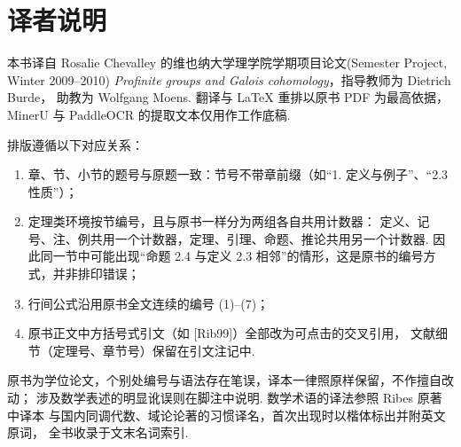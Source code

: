 
\chapter*{译者说明}

本书译自 Rosalie Chevalley 的维也纳大学理学院学期项目论文(Semester Project, Winter 2009--2010)
\emph{Profinite groups and Galois cohomology}，指导教师为 Dietrich Burde，
助教为 Wolfgang Moens. 翻译与 LaTeX 重排以原书 PDF 为最高依据，
MinerU 与 PaddleOCR 的提取文本仅用作工作底稿.

排版遵循以下对应关系：

\begin{enumerate}
    \item 章、节、小节的题号与原题一致：节号不带章前缀（如``1. 定义与例子''、``2.3 性质''）；
    \item 定理类环境按节编号，且与原书一样分为两组各自共用计数器：
          定义、记号、注、例共用一个计数器，定理、引理、命题、推论共用另一个计数器.
          因此同一节中可能出现``命题 2.4 与定义 2.3 相邻''的情形，这是原书的编号方式，并非排印错误；
    \item 行间公式沿用原书全文连续的编号 (1)--(7)；
    \item 原书正文中方括号式引文（如 [Rib99]）全部改为可点击的交叉引用，
          文献细节（定理号、章节号）保留在引文注记中.
\end{enumerate}

原书为学位论文，个别处编号与语法存在笔误，译本一律照原样保留，不作擅自改动；
涉及数学表述的明显讹误则在脚注中说明. 数学术语的译法参照 Ribes 原著中译本
与国内同调代数、域论论著的习惯译名，首次出现时以楷体标出并附英文原词，
全书收录于文末名词索引.

\vspace{0.5cm}
\hfill \Translator

\hfill \TranslationDate
